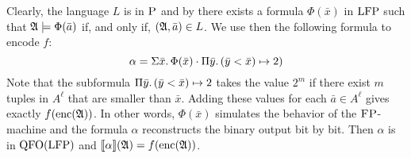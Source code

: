 Clearly, the language $L$ is in $\text{\sc P}$ and by \cite{I83} there exists a formula $\Phi(\bar{x})$ in ${\rm LFP}$ such that $\mathfrak{A}\models\Phi(\bar{a})$ if, and only if, $(\mathfrak{A},\bar{a})\in L$. 
We use then the following formula to encode $f$:
$$
\alpha = \Sigma{\bar{x}}.\, \Phi(\bar{x})\cdot \Pi{\bar{y}}.\,(\bar{y} < \bar{x}) \mapsto 2)$$
Note that the subformula $\Pi{\bar{y}}.\,(\bar{y} < \bar{x}) \mapsto 2$ takes the value $2^m$ if there exist $m$ tuples in $A^{\ell}$ that are smaller than $\bar{x}$. Adding these values for each $\bar{a}\in A^{\ell}$ gives exactly $f({\rm enc}(\mathfrak{A}))$. 
In other words, $\Phi(\bar{x})$ simulates the behavior of the $\text{\sc FP}$-machine and the formula $\alpha$ reconstructs the binary output bit by bit.
Then $\alpha$ is in ${\rm QFO}({\rm LFP})$ and ${\llbracket{}{\alpha}\rrbracket}(\mathfrak{A}) = f({\rm enc}(\mathfrak{A}))$.